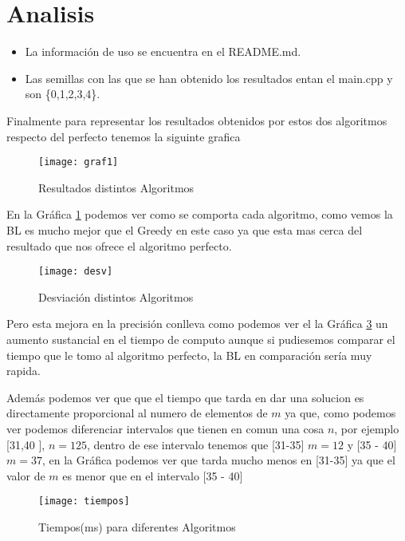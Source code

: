 \section{Analisis}
\begin{itemize}
  \item La información de uso se encuentra en el README.md.
  \item Las semillas con las que se han obtenido los resultados entan el main.cpp y son \{0,1,2,3,4\}.
\end{itemize}

Finalmente para representar los resultados obtenidos por estos dos algoritmos respecto del perfecto tenemos la siguinte grafica
\begin{figure}[h]
  \centering
  \texttt{[image: graf1]}
  \caption{Resultados distintos Algoritmos}
  \label{gra}
\end{figure}


En la Gráfica \ref{gra} podemos ver como se comporta cada algoritmo, como vemos la BL es mucho mejor que el Greedy en este caso ya que 
esta mas cerca del resultado que nos ofrece el algoritmo perfecto.\newpage


\begin{figure}[h]
  \centering
  \texttt{[image: desv]}
  \caption{Desviación distintos Algoritmos}
  \label{gra2}
\end{figure}

Pero esta mejora en la precisión conlleva como podemos ver el la Gráfica \ref{gra3} un aumento sustancial en el tiempo de computo
aunque si pudiesemos comparar el tiempo que le tomo al algoritmo perfecto, la BL en comparación sería muy rapida.

Además podemos ver que que el tiempo que tarda en dar una solucion es directamente proporcional al numero de elementos de $m$ ya
que, como podemos ver podemos diferenciar intervalos que tienen en comun una cosa $n$, por ejemplo [31,40 ], $n = 125$, dentro de ese
intervalo tenemos que [31-35] $m =12 $ y [35 - 40] $m =37 $, en la Gráfica podemos ver que tarda mucho menos en [31-35]
ya que el valor de $m$ es menor que en el intervalo [35 - 40]

\begin{figure}[h]
  \centering
  \texttt{[image: tiempos]}
  \caption{Tiempos(ms) para diferentes Algoritmos}
  \label{gra3}
\end{figure}



